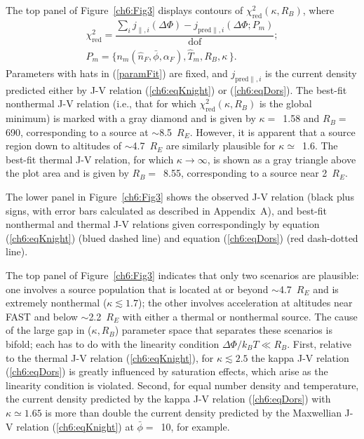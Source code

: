   The top panel of Figure~\ref{ch6:Fig3} displays contours of
  $\chi^2_{\textrm{red}} ( \kappa, R_B )$, where
  \begin{subequations}
    \begin{align} \chi^2_{\mathrm{red}} = \dfrac{\sum_i j_{\parallel,i} (\Delta \Phi) - j_{\textrm{pred}\parallel,i}(\Delta \Phi; P_m)}{\mathrm{dof}}; \\
      P_m = \Big \{ n_m ( \hat{n}_F, \bar{\phi} , \alpha_F ), \hat{T}_m, R_B,
      \kappa \, \Big \}. \label{paramFit}
    \end{align}
  \end{subequations}
  Parameters with hats in (\ref{paramFit}) are fixed, and
  $j_{\textrm{pred}\parallel,i} $ is the current density predicted either by J-V
  relation (\ref{ch6:eqKnight}) or (\ref{ch6:eqDors}). The best-fit nonthermal
  J-V relation (i.e., that for which $\chi^2_{\textrm{red}} ( \kappa, R_B )$ is
  the global minimum) is marked with a gray diamond and is given by $\kappa
  =$~1.58 and $R_B =$690, corresponding to a source at $\sim$8.5~$R_E$. However,
  it is apparent that a source region down to altitudes of $\sim$4.7~$R_E$ are
  similarly plausible for $\kappa \simeq$~1.6. The best-fit thermal J-V
  relation, for which $\kappa \rightarrow \infty$, is shown as a gray triangle
  above the plot area and is given by $R_B =$~8.55, corresponding to a source
  near 2~$R_E$.

  The lower panel in Figure~\ref{ch6:Fig3} shows the observed J-V relation
  (black plus signs, with error bars calculated as described in Appendix~A), and
  best-fit nonthermal and thermal J-V relations given correspondingly by
  equation (\ref{ch6:eqKnight}) (blued dashed line) and equation
  (\ref{ch6:eqDors}) (red dash-dotted line).

  The top panel of Figure~\ref{ch6:Fig3} indicates that only two scenarios are
  plausible: one involves a source population that is located at or beyond
  $\sim$4.7~$R_E$ and is extremely nonthermal ($\kappa \lesssim 1.7$); the other
  involves acceleration at altitudes near FAST and below $\sim$2.2~$R_E$ with
  either a thermal or nonthermal source. The cause of the large gap in ($\kappa,
  R_B$) parameter space that separates these scenarios is bifold; each has to do
  with the linearity condition $\Delta \Phi / k_B T \ll R_B $. First, relative
  to the thermal J-V relation (\ref{ch6:eqKnight}), for $\kappa \lesssim 2.5$
  the kappa J-V relation (\ref{ch6:eqDors}) is greatly influenced by saturation
  effects, which arise as the linearity condition is violated. Second, for equal
  number density and temperature, the current density predicted by the kappa J-V
  relation (\ref{ch6:eqDors}) with $\kappa \simeq 1.65$ is more than double the
  current density predicted by the Maxwellian J-V relation (\ref{ch6:eqKnight})
  at $\bar{\phi} =$~10, for example.

